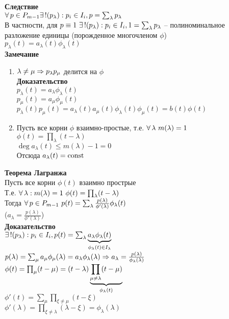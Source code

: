 \documentclass[12pt]{article}
\begin{document}
\textbf{Следствие}\\
$\fall p \in P_{m-1} \ex ! (p_\lambda): p_i \in I_i, p=\sum_\lambda p_\lambda$\\
В частности, для $p\equiv 1\ \ex! (p_\lambda): p_i \in I_i, 1=\sum_\lambda p_\lambda$ -- полиноминальное разложение единицы (порожденное многочленом $\phi$)\\
$p_\lambda(t) = a_\lambda(t)\phi_\lambda(t)$\\
\textbf{Замечание}
\begin{enumerate}
    \item $\lambda \neq \mu \Rto p_\lambda p_\mu$ делится на $\phi$\\
    \textbf{Доказательство}\\
    $p_\lambda(t) = a_\lambda \phi_\lambda(t)$\\
    $p_\mu(t) = a_\mu \phi_\mu(t)$\\
    $p_\lambda(t)p_\mu(t) = a_\lambda(t)a_\mu(t)\phi_\lambda(t)\phi_\mu(t) = b(t)\phi(t)$
    \item Пусть все корни $\phi$ взаимно-простые, т.е. $\fall \lambda\ m(\lambda) = 1$\\
    $\phi(t) = \prod_\lambda (t-\lambda)$\\
    $\deg a_\lambda(t) \leq m(\lambda) - 1 = 0$\\
    Отсюда $a_\lambda(t) = \const$
\end{enumerate}
\textbf{Теорема Лагранжа}\\
Пусть все корни $\phi(t)$ взаимно прострые\\
Т.е. $\fall \lambda: m(\lambda) = 1\ \phi(t) = \prod_\lambda (t-\lambda)$\\
Тогда $\fall p \in P_{m-1}\ p(t) = \sum_\lambda \frac{p(\lambda)}{\phi'(\lambda)}\phi_\lambda(t)$\\
($a_\lambda = \frac{p(\lambda)}{\phi'(\lambda)}$)\\
\textbf{Доказательство}\\
$\ex! (p_\lambda): p_i \in I_i, p(t) = \sum_\lambda \ub{\phi_\lambda(t)\in I_\lambda}{a_\lambda \phi_\lambda(t)}$\\
$p(\lambda) = \sum_\mu a_\mu \phi_\mu(\lambda) = a_\lambda \phi_\lambda(\lambda) \Rto a_\lambda = \frac{p(\lambda)}{\phi_\lambda(\lambda)}$\\
$\phi(t) = \prod_\mu (t-\mu) = (t-\lambda) \ub{\phi_\lambda(t)}{\prod_{\mu \neq \lambda} (t-\mu)}$\\
$\phi'(t) = \sum_\mu \prod_{\xi \neq \mu}(t-\xi)$\\
$\phi'(\lambda) = \prod_{\xi \neq \lambda} (\lambda - \xi) = \phi_\lambda(\lambda)$\\
\end{document}
